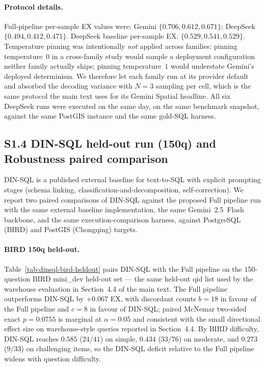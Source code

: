 \documentclass[11pt]{article}
\begin{document}
\paragraph{Protocol details.} Full-pipeline per-sample EX values were:
Gemini $\{0.706, 0.612, 0.671\}$; DeepSeek $\{0.494, 0.412, 0.471\}$.
DeepSeek baseline per-sample EX: $\{0.529, 0.541, 0.529\}$. Temperature
pinning was intentionally \emph{not} applied across families: pinning
temperature~$0$ in a cross-family study would sample a deployment
configuration neither family actually ships; pinning temperature~$1$ would
understate Gemini's deployed determinism. We therefore let each family run
at its provider default and absorbed the decoding variance with $N=3$
sampling per cell, which is the same protocol the main text uses for its
Gemini Spatial headline. All six DeepSeek runs were executed on the same day,
on the same benchmark snapshot, against the same PostGIS instance and the
same gold-SQL harness.

\subsection*{S1.4 DIN-SQL held-out run (150q) and Robustness paired comparison}

DIN-SQL is a published external baseline for text-to-SQL with explicit prompting
stages (schema linking, classification-and-decomposition, self-correction). We
report two paired comparisons of DIN-SQL against the proposed Full pipeline run
with the same external baseline implementation, the same Gemini~2.5~Flash backbone,
and the same execution-comparison harness, against PostgreSQL (BIRD) and PostGIS
(Chongqing) targets.

\paragraph{BIRD 150q held-out.} Table~\ref{tab:dinsql-bird-heldout} pairs DIN-SQL
with the Full pipeline on the 150-question BIRD mini\_dev held-out set --- the same
held-out qid list used by the warehouse evaluation in Section~4.4 of the main text.
The Full pipeline outperforms DIN-SQL by $+0.067$ EX, with discordant counts
$b=18$ in favour of the Full pipeline and $c=8$ in favour of DIN-SQL; paired
McNemar two-sided exact $p=0.0755$ is marginal at $\alpha=0.05$ and consistent
with the small directional effect size on warehouse-style queries reported in
Section~4.4. By BIRD difficulty, DIN-SQL reaches $0.585$ ($24/41$) on simple,
$0.434$ ($33/76$) on moderate, and $0.273$ ($9/33$) on challenging items, so the
DIN-SQL deficit relative to the Full pipeline widens with question difficulty.
\end{document}
